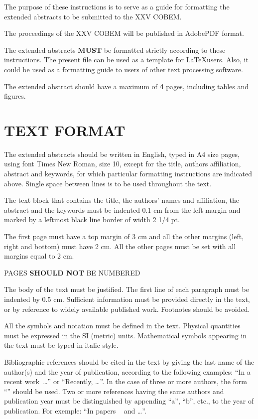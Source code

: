 The purpose of these instructions is to serve as a guide for formatting the extended abstracts to be submitted to the XXV COBEM.

The proceedings of the XXV COBEM will be published in Adobe\texttrademark\space PDF format.

The extended abstracts {\bf MUST} be formatted strictly according to these instructions. The present file can be used as a template for \LaTeX\space users. Also, it could be used as a formatting guide to users of other text processing software.

The extended abstract should have a maximum of {\bf 4} pages, including tables and figures.

\section{TEXT FORMAT}

The extended abstracts should be written in English, typed in A4 size pages, using font Times New Roman, size 10, except for the title, authors affiliation, abstract and keywords, for which particular formatting instructions are indicated above. Single space between lines is to be used throughout the text.

The text block that contains the title, the authors' names and affiliation, the abstract and the keywords must be indented 0.1 cm from the left margin and marked by a leftmost black line border of width 2 1/4 pt.

The first page must have a top margin of 3 cm and all the other margins (left, right and bottom) must have 2 cm. All the other pages must be set with all margins equal to 2 cm.

PAGES {\bf SHOULD NOT} BE NUMBERED

The body of the text must be justified. The first line of each paragraph must be indented by 0.5 cm. Sufficient information must be provided directly in the text, or by reference to widely available published work. Footnotes should be avoided.

All the symbols and notation must be defined in the text. Physical quantities must be expressed in the SI (metric) units. Mathematical symbols appearing in the text must be typed in italic style.

Bibliographic references should be cited in the text by giving the last name of the author(s) and the year of publication, according to the following examples: ``In a recent work~\citep{Miyagi1996}\dots'' or ``Recently, \citet{Xinglong2011}\dots''. In the case of three or more authors, the form ``\citep{Sivcev2018}'' should be used. Two or more references having the same authors and publication year must be distinguished by appending ``a'', ``b'', etc., to the year of publication. For exemple: ``In papers ~\citep{Xinglong2011} and \citep{Xinglong2011}\dots''.

